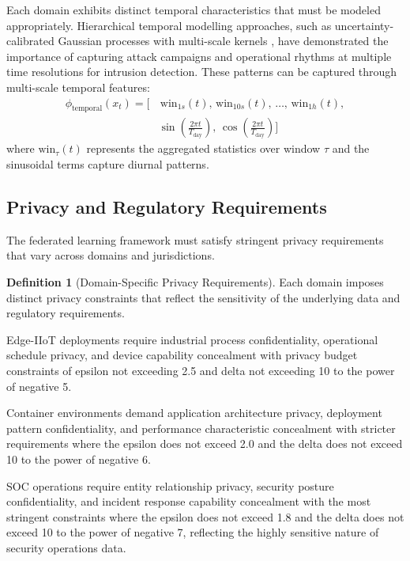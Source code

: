 \documentclass[12pt,a4paper]{article}
\theoremstyle{definition}
\newtheorem{definition}[theorem]{Definition}
\begin{document}
Each domain exhibits distinct temporal characteristics that must be modeled appropriately. Hierarchical temporal modelling approaches, such as uncertainty-calibrated Gaussian processes with multi-scale kernels \cite{anaedevha2026gp}, have demonstrated the importance of capturing attack campaigns and operational rhythms at multiple time resolutions for intrusion detection. These patterns can be captured through multi-scale temporal features:
\begin{equation}
\begin{aligned}
\phi_{\text{temporal}}(x_t) = \big[&\,\text{win}_{1s}(t),\, \text{win}_{10s}(t),\, \ldots,\, \text{win}_{1h}(t),\\
& \sin\!\left(\tfrac{2\pi t}{T_{\text{day}}}\right),\, \cos\!\left(\tfrac{2\pi t}{T_{\text{day}}}\right)\big]
\end{aligned}
\end{equation}
where $\text{win}_{\tau}(t)$ represents the aggregated statistics over window $\tau$ and the sinusoidal terms capture diurnal patterns.

\subsection{Privacy and Regulatory Requirements}

The federated learning framework must satisfy stringent privacy requirements that vary across domains and jurisdictions.

\begin{definition}[Domain-Specific Privacy Requirements]
\label{def:privacy_requirements}
Each domain imposes distinct privacy constraints that reflect the sensitivity of the underlying data and regulatory requirements.

Edge-IIoT deployments require industrial process confidentiality, operational schedule privacy, and device capability concealment with privacy budget constraints of epsilon not exceeding 2.5 and delta not exceeding 10 to the power of negative 5.

Container environments demand application architecture privacy, deployment pattern confidentiality, and performance characteristic concealment with stricter requirements where the epsilon does not exceed 2.0 and the delta does not exceed 10 to the power of negative 6.

SOC operations require entity relationship privacy, security posture confidentiality, and incident response capability concealment with the most stringent constraints where the epsilon does not exceed 1.8 and the delta does not exceed 10 to the power of negative 7, reflecting the highly sensitive nature of security operations data.
\end{definition}
\end{document}
